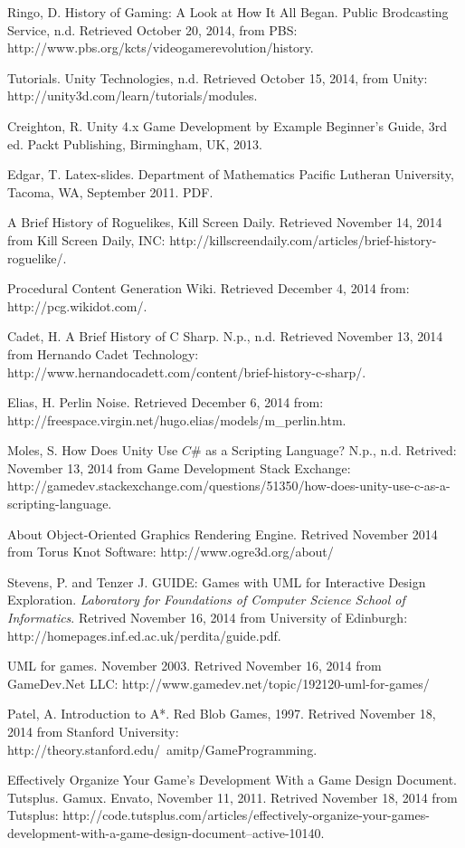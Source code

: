 \documentclass[12pt]{article}       %
\begin{document}
\begin{thebibliography}{99}

 Ringo, D. History of Gaming: A Look at How It All Began. Public Brodcasting Service, n.d. Retrieved October 20, 2014, from PBS: http://www.pbs.org/kcts/videogamerevolution/history. 

 Tutorials. Unity Technologies, n.d. Retrieved October 15, 2014, from Unity: http://unity3d.com/learn/tutorials/modules.

 Creighton, R. Unity 4.x Game Development by Example Beginner's Guide, 3rd ed. Packt Publishing, Birmingham, UK, 2013.

 Edgar, T. Latex-slides. Department of Mathematics Pacific Lutheran University, Tacoma, WA, September 2011. PDF. 

 A Brief History of Roguelikes, Kill Screen Daily. Retrieved November 14, 2014 from Kill Screen Daily, INC: http://killscreendaily.com/articles/brief-history-roguelike/.

 Procedural Content Generation Wiki. Retrieved December 4, 2014 from: http://pcg.wikidot.com/.

 Cadet, H. A Brief History of C Sharp.  N.p., n.d. Retrieved November 13, 2014 from Hernando Cadet Technology:  http://www.hernandocadett.com/content/brief-history-c-sharp/.

 Elias, H. Perlin Noise. Retrieved December 6, 2014 from: http://freespace.virgin.net/hugo.elias/models/m\_perlin.htm.

 Moles, S. How Does Unity Use $C\#$ as a Scripting Language? N.p., n.d. Retrived: November 13, 2014 from Game Development Stack Exchange: http://gamedev.stackexchange.com/questions/51350/how-does-unity-use-c-as-a-scripting-language.

 About Object-Oriented Graphics Rendering Engine. Retrived November 2014 from Torus Knot Software: http://www.ogre3d.org/about/

 Stevens, P. and Tenzer J. GUIDE: Games with UML for Interactive Design Exploration. 
{ \it Laboratory for Foundations of Computer Science School of Informatics}. Retrived November 16, 2014 from University of Edinburgh: http://homepages.inf.ed.ac.uk/perdita/guide.pdf.

 UML for games. November 2003. Retrived November 16, 2014 from GameDev.Net LLC: http://www.gamedev.net/topic/192120-uml-for-games/

 Patel, A. Introduction to A*. Red Blob Games, 1997. Retrived November 18, 2014 from Stanford University: http://theory.stanford.edu/~amitp/GameProgramming.
 
 Effectively Organize Your Game's Development With a Game Design Document. Tutsplus. Gamux. Envato, November 11, 2011. Retrived November 18, 2014 from Tutsplus: http://code.tutsplus.com/articles/effectively-organize-your-games-development-with-a-game-design-document--active-10140. 


\end{thebibliography}
\end{document}
